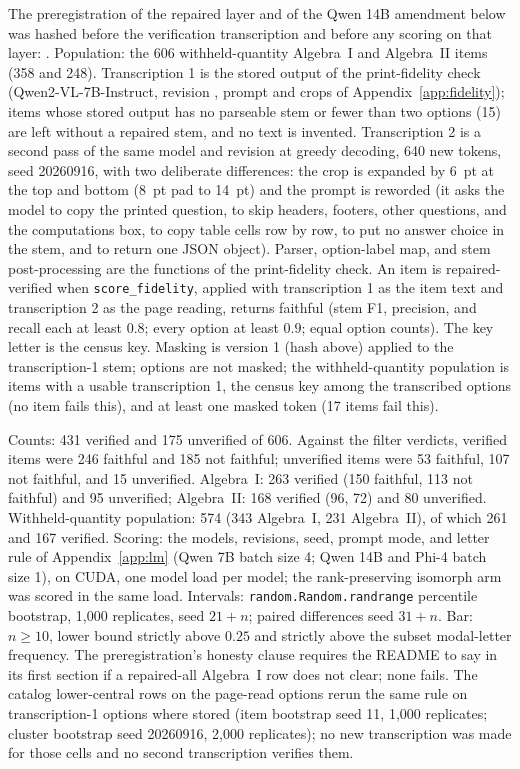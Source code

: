 The preregistration of the repaired layer and of the Qwen 14B amendment below was hashed before the verification transcription and before any scoring on that layer:
.
Population: the 606 withheld-quantity Algebra~I and Algebra~II items (358 and 248). Transcription 1 is the stored output of the print-fidelity check (Qwen2-VL-7B-Instruct, revision , prompt and crops of Appendix~\ref{app:fidelity}); items whose stored output has no parseable stem or fewer than two options (15) are left without a repaired stem, and no text is invented. Transcription 2 is a second pass of the same model and revision at greedy decoding, 640 new tokens, seed 20260916, with two deliberate differences: the crop is expanded by 6~pt at the top and bottom (8~pt pad to 14~pt) and the prompt is reworded (it asks the model to copy the printed question, to skip headers, footers, other questions, and the computations box, to copy table cells row by row, to put no answer choice in the stem, and to return one JSON object). Parser, option-label map, and stem post-processing are the functions of the print-fidelity check. An item is repaired-verified when \texttt{score\_fidelity}, applied with transcription 1 as the item text and transcription 2 as the page reading, returns faithful (stem F1, precision, and recall each at least $0.8$; every option at least $0.9$; equal option counts). The key letter is the census key. Masking is version 1 (hash above) applied to the transcription-1 stem; options are not masked; the withheld-quantity population is items with a usable transcription 1, the census key among the transcribed options (no item fails this), and at least one masked token (17 items fail this).

Counts: 431 verified and 175 unverified of 606. Against the filter verdicts, verified items were 246 faithful and 185 not faithful; unverified items were 53 faithful, 107 not faithful, and 15 unverified. Algebra~I: 263 verified (150 faithful, 113 not faithful) and 95 unverified; Algebra~II: 168 verified (96, 72) and 80 unverified. Withheld-quantity population: 574 (343 Algebra~I, 231 Algebra~II), of which 261 and 167 verified. Scoring: the models, revisions, seed, prompt mode, and letter rule of Appendix~\ref{app:lm} (Qwen 7B batch size 4; Qwen 14B and Phi-4 batch size 1), on CUDA, one model load per model; the rank-preserving isomorph arm was scored in the same load. Intervals: \texttt{random.Random.randrange} percentile bootstrap, 1{,}000 replicates, seed $21+n$; paired differences seed $31+n$. Bar: $n\ge 10$, lower bound strictly above $0.25$ and strictly above the subset modal-letter frequency. The preregistration's honesty clause requires the README to say in its first section if a repaired-all Algebra~I row does not clear; none fails. The catalog lower-central rows on the page-read options rerun the same rule on transcription-1 options where stored (item bootstrap seed 11, 1{,}000 replicates; cluster bootstrap seed 20260916, 2{,}000 replicates); no new transcription was made for those cells and no second transcription verifies them.

